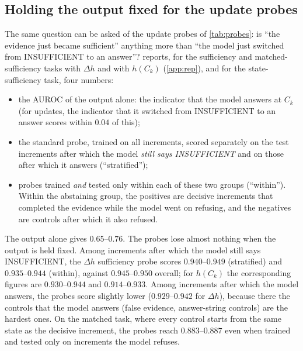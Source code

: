 \subsection{Holding the output fixed for the update probes}

The same question can be asked of the update probes of \cref{tab:probes}: is ``the evidence just became sufficient'' anything more than ``the model just switched from INSUFFICIENT to an answer''?  reports, for the sufficiency and matched-sufficiency tasks with $\Delta h$ and with $h(C_k)$ (\cref{app:rep}), and for the state-sufficiency task, four numbers:
\begin{itemize}
  \item the AUROC of the output alone: the indicator that the model answers at $C_k$ (for updates, the indicator that it switched from INSUFFICIENT to an answer scores within $0.04$ of this);
  \item the standard probe, trained on all increments, scored separately on the test increments after which the model \emph{still says INSUFFICIENT} and on those after which it answers (``stratified'');
  \item probes trained \emph{and} tested only within each of these two groups (``within''). Within the abstaining group, the positives are decisive increments that completed the evidence while the model went on refusing, and the negatives are controls after which it also refused.
\end{itemize}

\begin{table}[h]
\centering\scriptsize
\setlength{\tabcolsep}{3pt}

\caption{Sufficiency probes with the model's output held fixed (document split). Output only: AUROC of the indicator ``the model answers at $C_k$''. All: standard probe, all test increments. Stratified: the same probe on the test increments after which the model abstains (resp.\ answers). Within: probe trained and tested only on that group, layer re-selected by grouped inner cross-validation. The state-sufficiency rows are not count-matched (see \cref{tab:verbal_internal} for the count-matched version).}
\label{tab:behaviour_control}
\end{table}

The output alone gives $0.65$--$0.76$. The probes lose almost nothing when the output is held fixed. Among increments after which the model still says INSUFFICIENT, the $\Delta h$ sufficiency probe scores $0.940$--$0.949$ (stratified) and $0.935$--$0.944$ (within), against $0.945$--$0.950$ overall; for $h(C_k)$ the corresponding figures are $0.930$--$0.944$ and $0.914$--$0.933$. Among increments after which the model answers, the probes score slightly lower ($0.929$--$0.942$ for $\Delta h$), because there the controls that the model answers (false evidence, answer-string controls) are the hardest ones. On the matched task, where every control starts from the same state as the decisive increment, the probes reach $0.883$--$0.887$ even when trained and tested only on increments the model refuses.

